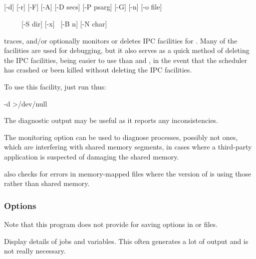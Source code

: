 \subsection{\XbRipcName}

\begin{expara}

\XbRipcName{} [-d] [-r] [-F] [-A] [-D secs] [-P psarg] [-G] [-n] [-o file]

\ \ \ \ \ [-S dir] [-x] \ [-B n] [-N char]

\end{expara}

\PrXbRipc{} traces, and/or optionally monitors or deletes IPC facilities for \ProductName{}. Many of
the facilities are used for debugging, but it also serves as a quick method of deleting the IPC facilities, being easier to use than
 and , in the event that the scheduler has crashed or been killed without deleting
the IPC facilities.

To use this facility, just run \PrXbRipc{} thus:

\begin{expara}

\XbRipcName{} -d {\textgreater}/dev/null

\end{expara}

The diagnostic output may be useful as it reports any inconsistencies.

The monitoring option can be used to diagnose processes, possibly not \ProductName{} ones, which are interfering with
\ProductName{} shared memory segments, in cases where a third-party application is suspected of damaging the shared
memory.

\PrXbRipc{} also checks for errors in memory-mapped files where the version of \ProductName{} is using those rather than shared
memory.

\subsubsection{Options}

Note that this program does not provide for saving options in \configurationfile{} or \homeconfigpath{} files.



Display details of jobs and variables. This often generates a lot of output and is not really necessary.

